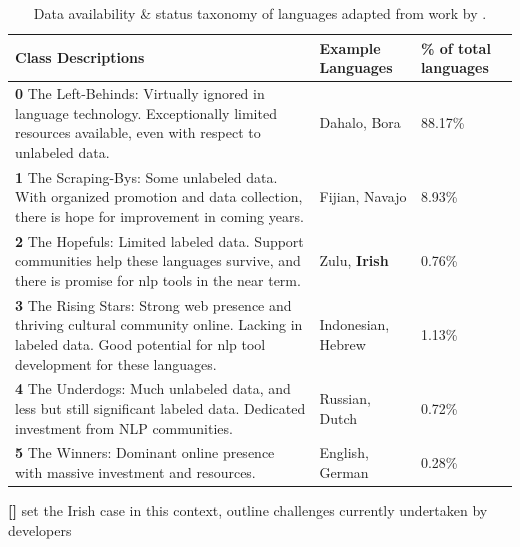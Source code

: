 \documentclass[thesis]{cluu}
\newcounter{paranum}
\newcommand{\numberedparagraph}{\par\refstepcounter{paranum}\textbf{[\theparanum] }}
\begin{document}
\begin{table}[h]
    \centering
    \begin{tabularx}{\textwidth}{|X|p{2cm}|p{1.75cm}|}
        \hline
        \textbf{Class Descriptions} & \textbf{Example Languages} & \textbf{\% of total languages}\\ \hline
        \textbf{0} The Left-Behinds: Virtually ignored in language technology. Exceptionally limited resources available, even with respect to unlabeled data. & Dahalo, Bora & 88.17\%\\ \hline
        \textbf{1} The Scraping-Bys: Some unlabeled data. With organized promotion and data collection, there is hope for improvement in coming years. & Fijian, Navajo & 8.93\%\\ \hline
        \textbf{2} The Hopefuls: Limited labeled data. Support communities help these languages survive, and there is promise for \gls{nlp} tools in the near term. & Zulu, \textbf{Irish} & 0.76\%\\ \hline
        \textbf{3} The Rising Stars: Strong web presence and thriving cultural community online. Lacking in labeled data. Good potential for \gls{nlp} tool development for these languages. & Indonesian, Hebrew & 1.13\%\\ \hline
        \textbf{4} The Underdogs: Much unlabeled data, and less but still significant labeled data. Dedicated investment from NLP communities. & Russian, Dutch & 0.72\%\\ \hline
        \textbf{5} The Winners: Dominant online presence with massive investment and resources. & English, German & 0.28\%\\ \hline
    \end{tabularx}
    \caption{Data availability \& status taxonomy of languages adapted from work by \textcite{joshiStateFateLinguistic2021}.}
    \label{tab:data_availability}
\end{table}
\numberedparagraph set the Irish case in this context, outline challenges currently undertaken by developers
\end{document}
